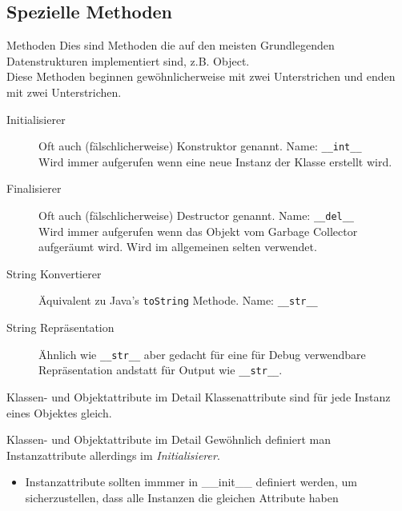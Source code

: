 \subsection{Spezielle Methoden}
\begin{frame}[fragile]{Methoden}
	Dies sind Methoden die auf den meisten Grundlegenden Datenstrukturen implementiert sind, z.B. Object.\\
	Diese Methoden beginnen gewöhnlicherweise mit zwei Unterstrichen und enden mit zwei Unterstrichen.

	\begin{description}
		\item[Initialisierer] Oft auch (fälschlicherweise) Konstruktor genannt. Name: \texttt{\_\_int\_\_}\\
			Wird immer aufgerufen wenn eine neue Instanz der Klasse erstellt wird.
		\item[Finalisierer] Oft auch (fälschlicherweise) Destructor genannt. Name: \texttt{\_\_del\_\_}\\
			Wird immer aufgerufen wenn das Objekt vom Garbage Collector aufgeräumt wird. Wird im allgemeinen selten verwendet.
		\item[String Konvertierer] Äquivalent zu Java's \texttt{toString} Methode. Name: \texttt{\_\_str\_\_}
		\item[String Repräsentation] Ähnlich wie \texttt{\_\_str\_\_} aber gedacht für eine für Debug verwendbare Repräsentation andstatt für Output wie \texttt{\_\_str\_\_}.
	\end{description}
\end{frame}

\begin{frame}[fragile]{Klassen- und Objektattribute im Detail}
	Klassenattribute sind für jede Instanz eines Objektes gleich.
	
\end{frame}

\begin{frame}[fragile]{Klassen- und Objektattribute im Detail}
	Gewöhnlich definiert man Instanzattribute allerdings im \textit{Initialisierer}.
	
	\begin{itemize}
		\item Instanzattribute sollten immmer in \_\_init\_\_ definiert werden, um sicherzustellen, dass alle Instanzen die gleichen Attribute haben
	\end{itemize}
\end{frame}



